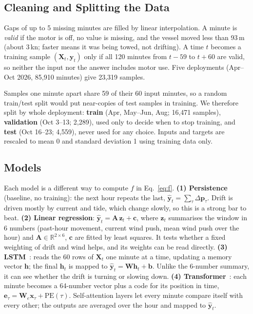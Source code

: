 \documentclass[sigconf]{acmart}
\begin{document}
\subsection{Cleaning and Splitting the Data}
Gaps of up to 5 missing minutes are filled by linear interpolation. A minute is \emph{valid} if the motor is off, no value is missing, and the vessel moved less than 93\,m (about 3\,kn; faster means it was being towed, not drifting). A time $t$ becomes a training sample $(\mathbf{X}_t,\mathbf{y}_t)$ only if all 120 minutes from $t-59$ to $t+60$ are valid, so neither the input nor the answer includes motor use. Five deployments (Apr--Oct 2026, 85{,}910 minutes) give 23{,}319 samples.

Samples one minute apart share 59 of their 60 input minutes, so a random train/test split would put near-copies of test samples in training. We therefore split by whole deployment: \textbf{train} (Apr, May--Jun, Aug; 16{,}471 samples), \textbf{validation} (Oct 3--13; 2{,}289), used only to decide when to stop training, and \textbf{test} (Oct 16--23; 4{,}559), never used for any choice. Inputs and targets are rescaled to mean 0 and standard deviation 1 using training data only.

\subsection{Models}
Each model is a different way to compute $f$ in Eq.~\ref{eq:f}.
\textbf{(1) Persistence} (baseline, no training): the next hour repeats the last, $\hat{\mathbf{y}}_t=\sum_{\tau}\Delta\mathbf{p}_\tau$. Drift is driven mostly by current and tide, which change slowly, so this is a strong bar to beat.
\textbf{(2) Linear regression}: $\hat{\mathbf{y}}_t=\mathbf{A}\,\mathbf{z}_t+\mathbf{c}$, where $\mathbf{z}_t$ summarises the window in 6 numbers (past-hour movement, current wind push, mean wind push over the hour) and $\mathbf{A}\in\mathbb{R}^{2\times6}$, $\mathbf{c}$ are fitted by least squares. It tests whether a fixed weighting of drift and wind helps, and its weights can be read directly.
\textbf{(3) LSTM}~\cite{hochreiter1997lstm}: reads the 60 rows of $\mathbf{X}_t$ one minute at a time, updating a memory vector $\mathbf{h}$; the final $\mathbf{h}_t$ is mapped to $\hat{\mathbf{y}}_t=\mathbf{W}\mathbf{h}_t+\mathbf{b}$. Unlike the 6-number summary, it can see whether the drift is turning or slowing down.
\textbf{(4) Transformer}~\cite{vaswani2017attention}: each minute becomes a 64-number vector plus a code for its position in time, $\mathbf{e}_\tau=\mathbf{W}_e\mathbf{x}_\tau+\mathrm{PE}(\tau)$. Self-attention layers let every minute compare itself with every other; the outputs are averaged over the hour and mapped to $\hat{\mathbf{y}}_t$.
\end{document}
